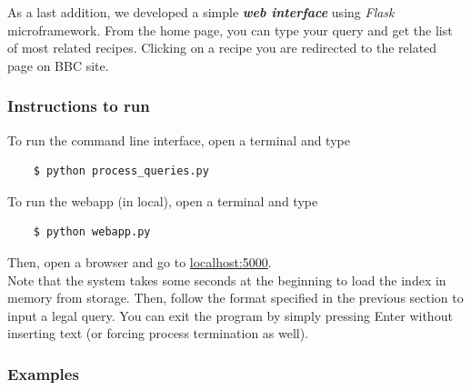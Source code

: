 \medskip

\noindent As a last addition, we developed a simple \textbf{\textit{web interface}} using \textit{Flask}\cite{flask} microframework. From the home page, you can type your query and get the list of most related recipes. Clicking on a recipe you are redirected to the related page on BBC site\cite{bbc}.


\subsubsection{Instructions to run}

To run the command line interface, open a terminal and type
\begin{lstlisting}
	$ python process_queries.py
\end{lstlisting}
To run the webapp (in local), open a terminal and type
\begin{lstlisting}
	$ python webapp.py
\end{lstlisting}
Then, open a browser and go to \url{localhost:5000}.\\
Note that the system takes some seconds at the beginning to load the index in memory from storage. Then, follow the format specified in the previous section to input a legal query. You can exit the program by simply pressing Enter without inserting text (or forcing process termination as well).


\subsubsection{Examples}